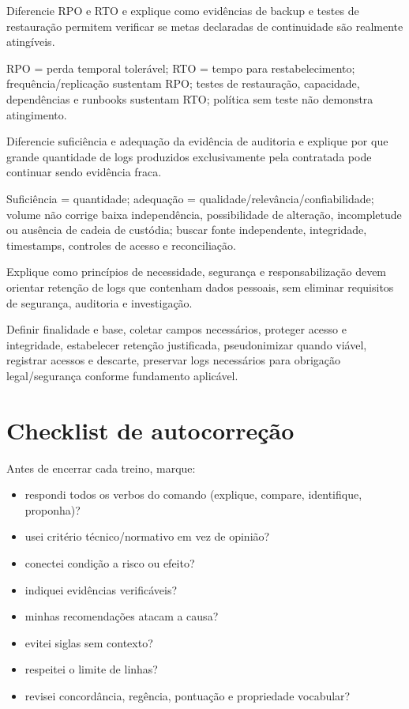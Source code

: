 \begin{discursiva}
Diferencie RPO e RTO e explique como evidências de backup e testes de restauração permitem verificar se metas declaradas de continuidade são realmente atingíveis.
\end{discursiva}
\begin{resumo}[espelho Q4]RPO = perda temporal tolerável; RTO = tempo para restabelecimento; frequência/replicação sustentam RPO; testes de restauração, capacidade, dependências e runbooks sustentam RTO; política sem teste não demonstra atingimento.\end{resumo}

\begin{discursiva}
Diferencie suficiência e adequação da evidência de auditoria e explique por que grande quantidade de logs produzidos exclusivamente pela contratada pode continuar sendo evidência fraca.
\end{discursiva}
\begin{resumo}[espelho Q5]Suficiência = quantidade; adequação = qualidade/relevância/confiabilidade; volume não corrige baixa independência, possibilidade de alteração, incompletude ou ausência de cadeia de custódia; buscar fonte independente, integridade, timestamps, controles de acesso e reconciliação.\end{resumo}

\begin{discursiva}
Explique como princípios de necessidade, segurança e responsabilização devem orientar retenção de logs que contenham dados pessoais, sem eliminar requisitos de segurança, auditoria e investigação.
\end{discursiva}
\begin{resumo}[espelho Q6]Definir finalidade e base, coletar campos necessários, proteger acesso e integridade, estabelecer retenção justificada, pseudonimizar quando viável, registrar acessos e descarte, preservar logs necessários para obrigação legal/segurança conforme fundamento aplicável.\end{resumo}

\section{Checklist de autocorreção}

Antes de encerrar cada treino, marque:
\begin{itemize}
\item respondi todos os verbos do comando (explique, compare, identifique, proponha)?
\item usei critério técnico/normativo em vez de opinião?
\item conectei condição a risco ou efeito?
\item indiquei evidências verificáveis?
\item minhas recomendações atacam a causa?
\item evitei siglas sem contexto?
\item respeitei o limite de linhas?
\item revisei concordância, regência, pontuação e propriedade vocabular?
\end{itemize}

